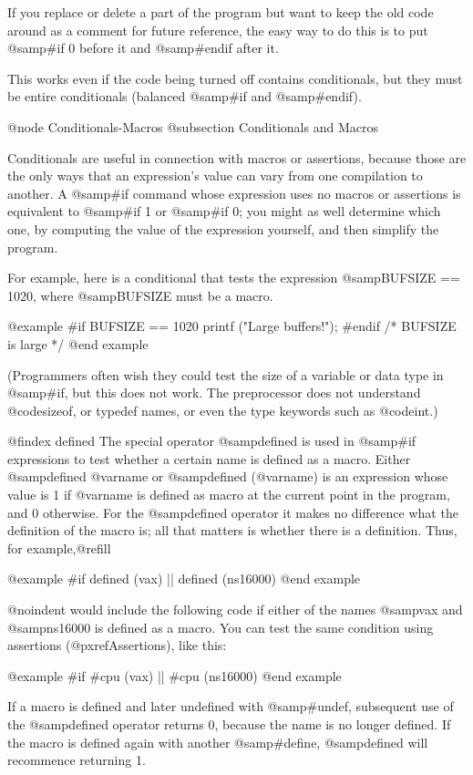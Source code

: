 {{If you replace or delete a part of the program but want to keep the old
code around as a comment for future reference, the easy way to do this is
to put @samp{#if 0} before it and @samp{#endif} after it.

This works even if the code being turned off contains conditionals, but
they must be entire conditionals (balanced @samp{#if} and @samp{#endif}).

@node Conditionals-Macros
@subsection Conditionals and Macros

Conditionals are useful in connection with macros or assertions, because
those are the only ways that an expression's value can vary from one
compilation to another.  A @samp{#if} command whose expression uses no
macros or assertions is equivalent to @samp{#if 1} or @samp{#if 0}; you
might as well determine which one, by computing the value of the
expression yourself, and then simplify the program.

For example, here is a conditional that tests the expression
@samp{BUFSIZE == 1020}, where @samp{BUFSIZE} must be a macro.

@example
#if BUFSIZE == 1020
  printf ("Large buffers!\n");
#endif /* BUFSIZE is large */
@end example

(Programmers often wish they could test the size of a variable or data
type in @samp{#if}, but this does not work.  The preprocessor does not
understand @code{sizeof}, or typedef names, or even the type keywords
such as @code{int}.)

@findex defined
The special operator @samp{defined} is used in @samp{#if} expressions to
test whether a certain name is defined as a macro.  Either @samp{defined
@var{name}} or @samp{defined (@var{name})} is an expression whose value
is 1 if @var{name} is defined as macro at the current point in the
program, and 0 otherwise.  For the @samp{defined} operator it makes no
difference what the definition of the macro is; all that matters is
whether there is a definition.  Thus, for example,@refill

@example
#if defined (vax) || defined (ns16000)
@end example

@noindent
would include the following code if either of the names @samp{vax} and
@samp{ns16000} is defined as a macro.  You can test the same condition
using assertions (@pxref{Assertions}), like this:

@example
#if #cpu (vax) || #cpu (ns16000)
@end example

If a macro is defined and later undefined with @samp{#undef},
subsequent use of the @samp{defined} operator returns 0, because
the name is no longer defined.  If the macro is defined again with
another @samp{#define}, @samp{defined} will recommence returning 1.

}}
